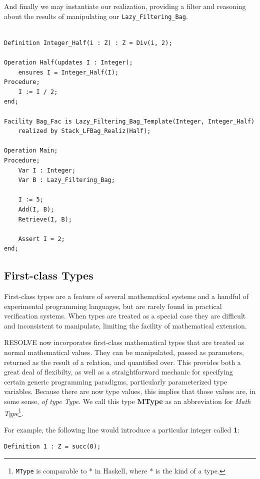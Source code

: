 And finally we may instantiate our realization, providing a filter and reasoning about the results of manipulating our \texttt{Lazy\_Filtering\_Bag}.

\begin{lstlisting}

Definition Integer_Half(i : Z) : Z = Div(i, 2);

Operation Half(updates I : Integer);
	ensures I = Integer_Half(I); 
Procedure;
	I := I / 2;
end;

Facility Bag_Fac is Lazy_Filtering_Bag_Template(Integer, Integer_Half)
	realized by Stack_LFBag_Realiz(Half);

Operation Main;
Procedure;
	Var I : Integer;
	Var B : Lazy_Filtering_Bag;

	I := 5;
	Add(I, B);
	Retrieve(I, B);

	Assert I = 2;
end;
\end{lstlisting}

	\subsection{First-class Types\label{firstClassTypes}}

First-class types are a feature of several mathematical systems and a handful of experimental programming languages, but are rarely found in practical verification systems.  When types are treated as a special case they are difficult and inconsistent to manipulate, limiting the facility of mathematical extension.

RESOLVE now incorporates first-class mathematical types that are treated as normal mathematical values.  They can be manipulated, passed as parameters, returned as the result of a relation, and quantified over.  This provides both a great deal of flexibilty, as well as a straightforward mechanic for specifying certain generic programming paradigms, particularly parameterized type variables.  Because there are now type values, this implies that those values are, in some sense, \emph{of type Type}.  We call this type \textbf{MType} as an abbreviation for \emph{Math Type}\footnote{\texttt{MType} is comparable to * in Haskell, where * is the kind of a type.}.

For example, the following line would introduce a particular integer called \textbf{1}:

\begin{lstlisting}
Definition 1 : Z = succ(0);
\end{lstlisting}

